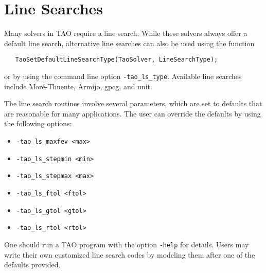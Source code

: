 \section{Line Searches} 
\label{sec:TaoLineSearch}

Many solvers in TAO require a line search.  While these solvers always
offer a default line search, alternative line searches can also be used
using the function
\begin{verbatim}
   TaoSetDefaultLineSearchType(TaoSolver, LineSearchType);
\end{verbatim}
or by using the command line option  {\tt -tao\_ls\_type}.  
Available line searches 
include Mor\'{e}-Thuente\cite{more:92}, Armijo, gpcg, and unit.

The line search routines involve several parameters, which are set
to defaults that are reasonable for many applications.  The user
can override the defaults by using the following options:
\begin{itemize}
\item {\tt -tao\_ls\_maxfev <max>}
\item {\tt -tao\_ls\_stepmin <min>}
\item {\tt -tao\_ls\_stepmax <max>}
\item {\tt -tao\_ls\_ftol <ftol>}
\item {\tt -tao\_ls\_gtol <gtol>}
\item {\tt -tao\_ls\_rtol <rtol>}
\end{itemize}

One should run a TAO program with the option 
{\tt -help}
for details.  Users may write their own customized line search codes
by modeling them after one of the defaults provided.

